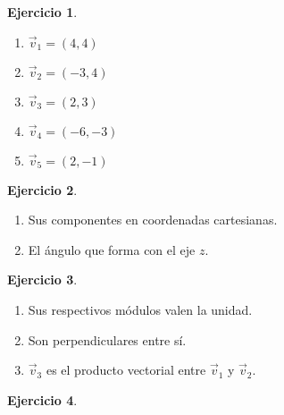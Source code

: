 \documentclass[a4paper,12pt,twoside]{book}
\newtheorem{ejercicio}{{Ejercicio}}[chapter]
\begin{document}
\begin{mdframed}[style=ejercicio-facil]
    \begin{ejercicio}
    \end{ejercicio}
    \begin{enumerate}
        \item $\vec{v}_1 = (4,4)$
        \item $\vec{v}_2 = (-3,4)$
        \item $\vec{v}_3 = (2,3)$
        \item $\vec{v}_4 = (-6,-3)$
        \item $\vec{v}_5 = (2,-1)$
    \end{enumerate}
\end{mdframed}

\begin{mdframed}[style=ejercicio-facil]
    \begin{ejercicio}
    \end{ejercicio}
    \begin{enumerate}
        \item Sus componentes en coordenadas cartesianas.
        \item El ángulo que forma con el eje $z$.
    \end{enumerate}
\end{mdframed}

\begin{mdframed}[style=ejercicio-facil]
    \begin{ejercicio}
    \end{ejercicio}
    \begin{enumerate}
        \item Sus respectivos módulos valen la unidad.
        \item Son perpendiculares entre sí.
        \item $\vec{v}_3$ es el producto vectorial entre $\vec{v}_1$ y $\vec{v}_2$.
    \end{enumerate}
\end{mdframed}

\begin{mdframed}[style=ejercicio-facil]
    \begin{ejercicio}
    \end{ejercicio}
\end{mdframed}
\end{document}

